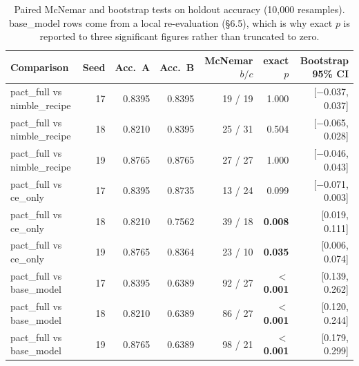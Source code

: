 \begin{table}[t]
\centering
\small
{}
\caption{Contextual-temperature calibration: inner-split fit and holdout effect.}
\label{tab:calibration}
\end{table}

\begin{table}[t]
\centering
\small
\begin{tabular}{lrrrrrr}
\toprule
Comparison & Seed & Acc.\ A & Acc.\ B & McNemar $b/c$ & exact $p$ & Bootstrap 95\% CI \\
\midrule
pact\_full vs nimble\_recipe & 17 & 0.8395 & 0.8395 & 19 / 19 & 1.000 & [$-$0.037, 0.037] \\
pact\_full vs nimble\_recipe & 18 & 0.8210 & 0.8395 & 25 / 31 & 0.504 & [$-$0.065, 0.028] \\
pact\_full vs nimble\_recipe & 19 & 0.8765 & 0.8765 & 27 / 27 & 1.000 & [$-$0.046, 0.043] \\
pact\_full vs ce\_only & 17 & 0.8395 & 0.8735 & 13 / 24 & 0.099 & [$-$0.071, 0.003] \\
pact\_full vs ce\_only & 18 & 0.8210 & 0.7562 & 39 / 18 & \textbf{0.008} & [0.019, 0.111] \\
pact\_full vs ce\_only & 19 & 0.8765 & 0.8364 & 23 / 10 & \textbf{0.035} & [0.006, 0.074] \\
pact\_full vs base\_model & 17 & 0.8395 & 0.6389 & 92 / 27 & \textbf{$<$0.001} & [0.139, 0.262] \\
pact\_full vs base\_model & 18 & 0.8210 & 0.6389 & 86 / 27 & \textbf{$<$0.001} & [0.120, 0.244] \\
pact\_full vs base\_model & 19 & 0.8765 & 0.6389 & 98 / 21 & \textbf{$<$0.001} & [0.179, 0.299] \\
\bottomrule
\end{tabular}
\caption{Paired McNemar and bootstrap tests on holdout accuracy (10{,}000 resamples). base\_model rows come from a local re-evaluation (\S6.5), which is why exact $p$ is reported to three significant figures rather than truncated to zero.}
\label{tab:significance}
\end{table}


